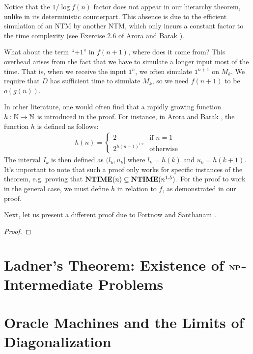 \documentclass[11pt,twoside=off,numbers=noenddot]{scrbook}
\begin{document}
\begin{remark}
  Notice that the $1 / \log f(n)$ factor does not appear in our hierarchy theorem, unlike in its deterministic counterpart. This absence is due to the efficient simulation of an NTM by another NTM, which only incurs a constant factor to the time complexity (see Exercise 2.6 of Arora and Barak \cite{arora2009computational}).
\end{remark}

\begin{remark}
  What about the term ``$+ 1$'' in $f(n + 1)$, where does it come from? This overhead arises from the fact that we have to simulate a longer input most of the time. That is, when we receive the input $\texttt{1}^{n}$, we often simulate $\texttt{1}^{n + 1}$ on $M_k$. We require that $D$ has sufficient time to simulate $M_k$, so we need $f(n + 1)$ to be $o(g(n))$.
\end{remark}

\begin{remark}
  In other literature, one would often find that a rapidly growing function $h : \mathbb N \to \mathbb N$ is introduced in the proof. For instance, in Arora and Barak \cite{arora2009computational}, the function $h$ is defined as follows:
  \begin{align*}
    h(n) =
    \begin{cases}
      2 & \text{if $n = 1$} \\
      2^{h(n - 1)^{1.2}} & \text{otherwise}
    \end{cases}
  \end{align*}
  The interval $I_k$ is then defined as $(l_k, u_k]$ where $l_k = h(k)$ and $u_k = h(k + 1)$. It's important to note that such a proof only works for specific instances of the theorem, e.g. proving that $\textbf{NTIME}(n) \subsetneq \textbf{NTIME}(n^{1.5})$. For the proof to work in the general case, we must define $h$ in relation to $f$, as demonstrated in our proof.
\end{remark}

Next, let us present a different proof due to Fortnow and Santhanam \cite{fortnow2011robust}.

\begin{proof}
\end{proof}

\section{Ladner's Theorem: Existence of $\textbf{NP}$-Intermediate Problems}

\section{Oracle Machines and the Limits of Diagonalization}

\printbibliography[nottype=image]
\end{document}
